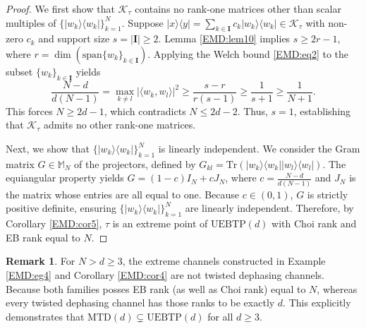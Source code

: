 \documentclass[11pt,reqno]{amsart}
\theoremstyle{definition}
\newtheorem{rmk}[defn]{Remark}
\theoremstyle{plain}
\theoremstyle{remark}
\newcommand{\la}{\langle}
\newcommand{\ra}{\rangle}
\numberwithin{equation}{section}%
\begin{document}
\begin{proof}
	We first show that $\mathscr{K}_\tau$ contains no rank-one matrices other than scalar multiples of $\{|w_k\ra\la w_k|\}_{k=1}^N$. Suppose $|x\ra\la y| = \sum_{k\in\mathbf{I}} c_k |w_k\ra\la w_k| \in \mathscr{K}_\tau$ with non-zero $c_k$ and support size $s = |\mathbf{I}| \ge 2$. Lemma \ref{EMD:lem10} implies $s \ge 2r - 1$, where $r = \dim(\text{span}\{w_k\}_{k\in\mathbf{I}})$. 
	Applying the Welch bound \eqref{EMD:eq2} to the subset $\{w_k\}_{k\in\mathbf{I}}$ yields
	\[
	\frac{N-d}{d(N-1)} = \max_{k \ne l} |\la w_k, w_l\ra|^2 \ge \frac{s-r}{r(s-1)} \ge \frac{1}{s+1} \ge \frac{1}{N+1}.
	\]
	This forces $N \ge 2d-1$, which contradicts $N \le 2d - 2$. Thus, $s=1$, establishing that $\mathscr{K}_\tau$ admits no other rank-one matrices. 
	
	Next, we show that $\{|w_k\ra\la w_k|\}_{k=1}^N$ is linearly independent. We consider the Gram matrix $G \in \mathbb{M}_N$ of the projectors, defined by $G_{kl} = \text{Tr}(|w_k\ra\la w_k||w_l\ra\la w_l|)$. The equiangular property yields $G = (1-c)I_N + c J_N$, where $c = \frac{N-d}{d(N-1)}$ and $J_N$ is the matrix whose entries are all equal to one. Because $c\in(0, 1)$, $G$ is strictly positive definite, ensuring $\{|w_k\ra\la w_k|\}_{k=1}^N$ are linearly independent. Therefore, by Corollary \ref{EMD:cor5}, $\tau$ is an extreme point of $\mathrm{UEBTP}(d)$ with Choi rank and EB rank equal to $N$.
\end{proof}


\begin{rmk}
    For $N>d\ge3$, the extreme channels constructed in Example \ref{EMD:eg4} and Corollary \ref{EMD:cor4} are not twisted dephasing channels. Because both families posses EB rank (as well as Choi rank) equal to $N$, whereas every twisted dephasing channel has those ranks to be exactly $d$. This explicitly demonstrates that $\mathrm{MTD}(d) \subsetneq \mathrm{UEBTP}(d)$ for all $d \ge 3$.  
\end{rmk}
\end{document}
